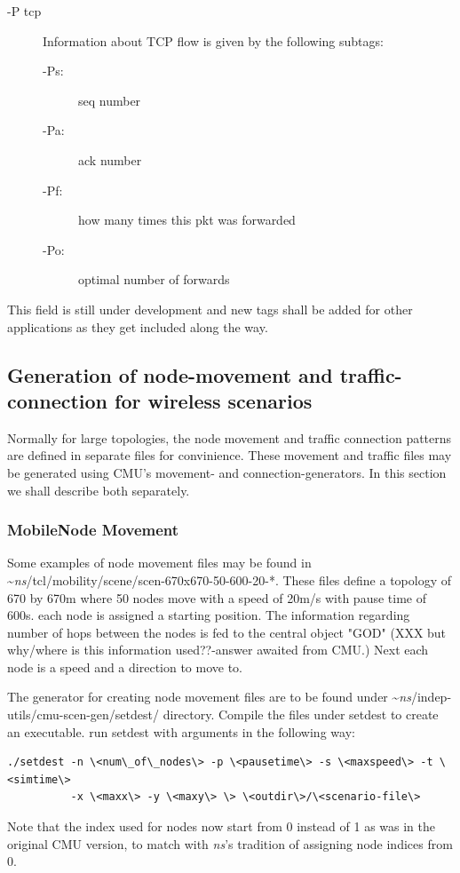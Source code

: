 \begin{description}
\begin{description}
\item[-P tcp] Information about TCP flow is given by the following
subtags:

\begin{description}
\item[-Ps:] seq number
\item[-Pa:] ack number
\item[-Pf:] how many times this pkt was forwarded
\item[-Po:] optimal number of forwards 
\end{description}
\end{description}

This field is still under development and new tags shall be added for
other applications as they get included along the way.
\end{description}


\subsection{Generation of node-movement and traffic-connection for
  wireless scenarios}
\label{sec:mobile-scen-generator}

Normally for large topologies, the node movement and traffic connection
patterns are defined in separate files for convinience. These movement and
traffic files may be generated using CMU's movement- and
connection-generators. In this section we shall describe both separately.

\subsubsection{MobileNode Movement}
\label{sec:mobile-movement-file}

Some examples of node movement files may be found in
\textasciitilde\emph{ns}/{tcl/mobility/scene/scen-670x670-50-600-20-*}. These files
define a topology of 670 by 670m where 50 nodes move with a speed of 20m/s
with pause time of 600s. each node is assigned a starting position. The
information regarding number of hops between the nodes is fed to the
central object "GOD" (XXX but why/where is this information used??-answer
awaited from CMU.) Next each node is a speed and a direction to move to. 

The generator for creating node movement files are to be found under
\textasciitilde\emph{ns}/{indep-utils/cmu-scen-gen/setdest/} directory. Compile the files
under setdest to create an executable. run setdest with arguments in
the following way:
\begin{verbatim}
./setdest -n \<num\_of\_nodes\> -p \<pausetime\> -s \<maxspeed\> -t \<simtime\>
          -x \<maxx\> -y \<maxy\> \> \<outdir\>/\<scenario-file\>
\end{verbatim}
Note that the index used for nodes now start from 0 instead of 1 as
was in the original CMU version, to match with \emph{ns}'s tradition of
assigning node indices from 0.


